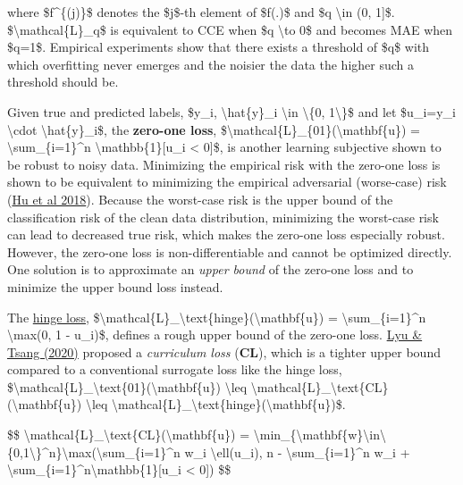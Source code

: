 where \$f\^{}\{(j)\}\$ denotes the \$j\$-th element of \$f(.)\$ and \$q \textbackslash in (0, 1{]}\$. \$\textbackslash mathcal\{L\}\_q\$ is equivalent to CCE when \$q \textbackslash to 0\$ and becomes MAE when \$q=1\$. Empirical experiments show that there exists a threshold of \$q\$ with which overfitting never emerges and the noisier the data the higher such a threshold should be.

Given true and predicted labels, \$y\_i, \textbackslash hat\{y\}\_i \textbackslash in \textbackslash\{0, 1\textbackslash\}\$ and let \$u\_i=y\_i \textbackslash cdot \textbackslash hat\{y\}\_i\$, the \textbf{zero-one loss}, \$\textbackslash mathcal\{L\}\_\{01\}(\textbackslash mathbf\{u\}) = \textbackslash sum\_\{i=1\}\^{}n \textbackslash mathbb\{1\}{[}u\_i \textless{} 0{]}\$, is another learning subjective shown to be robust to noisy data. Minimizing the empirical risk with the zero-one loss is shown to be equivalent to minimizing the empirical adversarial (worse-case) risk (\href{https://arxiv.org/abs/1611.02041}{Hu et al 2018}). Because the worst-case risk is the upper bound of the classification risk of the clean data distribution, minimizing the worst-case risk can lead to decreased true risk, which makes the zero-one loss especially robust. However, the zero-one loss is non-differentiable and cannot be optimized directly. One solution is to approximate an \emph{upper bound} of the zero-one loss and to minimize the upper bound loss instead.

The \href{https://en.wikipedia.org/wiki/Hinge_loss}{hinge loss}, \$\textbackslash mathcal\{L\}\_\textbackslash text\{hinge\}(\textbackslash mathbf\{u\}) = \textbackslash sum\_\{i=1\}\^{}n \textbackslash max(0, 1 - u\_i)\$, defines a rough upper bound of the zero-one loss. \href{https://arxiv.org/abs/1905.10045}{Lyu \& Tsang (2020)} proposed a \emph{curriculum loss} (\textbf{CL}), which is a tighter upper bound compared to a conventional surrogate loss like the hinge loss, \$\textbackslash mathcal\{L\}\_\textbackslash text\{01\}(\textbackslash mathbf\{u\}) \textbackslash leq \textbackslash mathcal\{L\}\_\textbackslash text\{CL\}(\textbackslash mathbf\{u\}) \textbackslash leq \textbackslash mathcal\{L\}\_\textbackslash text\{hinge\}(\textbackslash mathbf\{u\})\$.

\$\$ \textbackslash mathcal\{L\}\_\textbackslash text\{CL\}(\textbackslash mathbf\{u\}) = \textbackslash min\_\{\textbackslash mathbf\{w\}\textbackslash in\textbackslash\{0,1\textbackslash\}\^{}n\}\textbackslash max(\textbackslash sum\_\{i=1\}\^{}n w\_i \textbackslash ell(u\_i), n - \textbackslash sum\_\{i=1\}\^{}n w\_i + \textbackslash sum\_\{i=1\}\^{}n\textbackslash mathbb\{1\}{[}u\_i \textless{} 0{]}) \$\$

